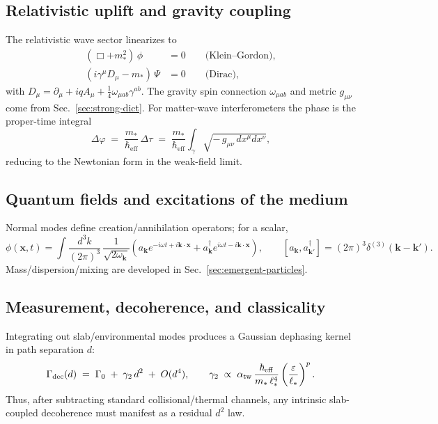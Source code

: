 \subsection{Relativistic uplift and gravity coupling}
\label{sec:QM_relativistic}

The relativistic wave sector linearizes to
\begin{align}
(\Box + m_*^2)\,\phi &= 0 \qquad \text{(Klein--Gordon)}, 
\label{eq:kg}\\
(i\gamma^\mu D_\mu - m_*)\,\Psi &= 0 \qquad \text{(Dirac)},
\label{eq:dirac}
\end{align}
with \(D_\mu=\partial_\mu + iqA_\mu + \tfrac{1}{4}\omega_{\mu ab}\gamma^{ab}\). The gravity spin connection \(\omega_{\mu ab}\) and metric \(g_{\mu\nu}\) come from Sec.~\ref{sec:strong-dict}. For matter-wave interferometers the phase is the proper-time integral
\begin{equation}
\Delta \varphi \;=\; \frac{m_*}{\hbar_{\mathrm{eff}}}\,\Delta \tau \;=\; \frac{m_*}{\hbar_{\mathrm{eff}}}\int_\gamma \!\sqrt{-\,g_{\mu\nu}\,dx^\mu dx^\nu},
\label{eq:grav-phase}
\end{equation}
reducing to the Newtonian form in the weak-field limit.

\subsection{Quantum fields and excitations of the medium}
\label{sec:QM_qft}

Normal modes define creation/annihilation operators; for a scalar,
\begin{equation}
\phi(\mathbf{x},t)=\int \!\frac{d^3k}{(2\pi)^3}\,\frac{1}{\sqrt{2\omega_{\mathbf k}}}\left(a_{\mathbf k}e^{-i\omega t+i\mathbf{k}\cdot\mathbf{x}} + a_{\mathbf k}^\dagger e^{i\omega t-i\mathbf{k}\cdot\mathbf{x}}\right),\qquad [a_{\mathbf k},a_{\mathbf k'}^\dagger]=(2\pi)^3\delta^{(3)}(\mathbf k-\mathbf k').
\label{eq:mode-expansion}
\end{equation}
Mass/dispersion/mixing are developed in Sec.~\ref{sec:emergent-particles}.

\subsection{Measurement, decoherence, and classicality}
\label{sec:QM_measurement}

Integrating out slab/environmental modes produces a Gaussian dephasing kernel in path separation \(d\):
\begin{equation}
\Gamma_{\mathrm{dec}}(d) \;=\; \Gamma_0 \;+\; \gamma_2\, d^2 \;+\; O(d^4), 
\qquad 
\gamma_2 \;\propto\; \alpha_{\rm tw}\,\frac{\hbar_{\mathrm{eff}}}{m_*\,\ell_*^4}\left(\frac{\varepsilon}{\ell_*}\right)^{p}.
\label{eq:decoherence}
\end{equation}
Thus, after subtracting standard collisional/thermal channels, any intrinsic slab-coupled decoherence must manifest as a residual \(d^2\) law.

